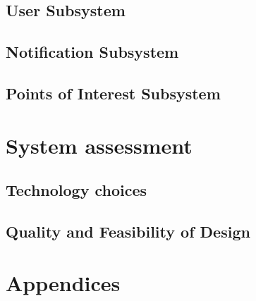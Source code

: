 \documentclass{article}
\begin{document}
			    
			\subsection{User Subsystem}\label{subsec:users}
			\subsection{Notification Subsystem}\label{subsec:notification}
			\subsection{Points of Interest Subsystem}\label{subsec:points of interest}

		\newpage

		\section{System assessment}\label{sec:assessment }	
			\subsection{Technology choices}\label{subsec:tech choices}
			\subsection{Quality and Feasibility of Design}\label{subsec:quality}

	 \cleardoublepage
	 \section{Appendices}\label{sec:appendices}
 		
	
\end{document}

